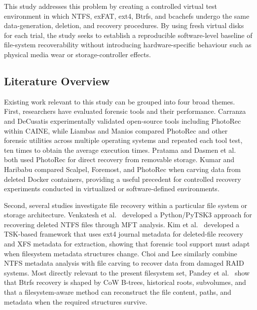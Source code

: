\documentclass[conference]{IEEEtran}
\begin{document}
This study addresses this problem by creating a controlled virtual test environment in which NTFS, exFAT, ext4, Btrfs, and bcachefs undergo the same data-generation, deletion, and recovery procedures. By using fresh virtual disks for each trial, the study seeks to establish a reproducible software-level baseline of file-system recoverability without introducing hardware-specific behaviour such as physical media wear or storage-controller effects.

\subsection{Literature Overview}

Existing work relevant to this study can be grouped into four broad themes. First, researchers have evaluated forensic tools and their performance. Carranza and DeCusatis \cite{carranza2021daubert} experimentally validated open-source tools including PhotoRec within CAINE, while Liambas and Manios \cite{liambas2024performance} compared PhotoRec and other forensic utilities across multiple operating systems and repeated each tool test, ten times to obtain the average execution times. Pratama \cite{pratama2021photorec} and Dasmen et al.\ \cite{dasmen2024photorec} both used PhotoRec for direct recovery from removable storage. Kumar and Haribabu \cite{kumar2022docker} compared Scalpel, Foremost, and PhotoRec when carving data from deleted Docker containers, providing a useful precedent for controlled recovery experiments conducted in virtualized or software-defined environments.

Second, several studies investigate file recovery within a particular file system or storage architecture. Venkatesh et al.\ \cite{venkatesh2024ntfs} developed a Python/PyTSK3 approach for recovering deleted NTFS files through MFT analysis. Kim et al.\ \cite{kim2021ext4xfs} developed a TSK-based framework that uses ext4 journal metadata for deleted-file recovery and XFS metadata for extraction, showing that forensic tool support must adapt when filesystem metadata structures change. Choi and Lee \cite{choi2022raid} similarly combine NTFS metadata analysis with file carving to recover data from damaged RAID systems. Most directly relevant to the present filesystem set, Pandey et al.\ \cite{pandey2026btrfs} show that Btrfs recovery is shaped by CoW B-trees, historical roots, subvolumes, and that a filesystem-aware method can reconstruct the file content, paths, and metadata when the required structures survive.
\end{document}
